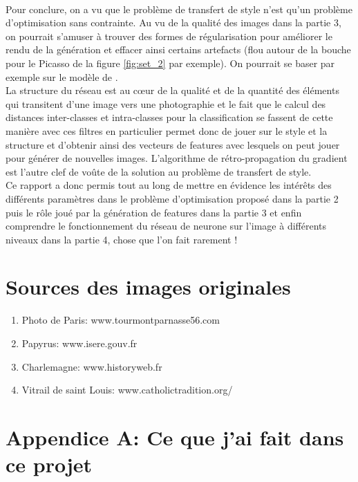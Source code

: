 \documentclass{article}
\begin{document}
\paragraph*{}
Pour conclure, on a vu que le problème de transfert de style n'est qu'un problème d'optimisation sans contrainte. Au vu de la qualité des images dans la partie 3, on pourrait s'amuser à trouver des formes de régularisation pour améliorer le rendu de la génération et effacer ainsi certains artefacts (flou autour de la bouche pour le Picasso de la figure \ref{fig:set_2} par exemple). On pourrait se baser par exemple sur le modèle de \cite{DBLP:journals/corr/MahendranV14}.\\
La structure du réseau est au cœur de la qualité et de la quantité des éléments qui transitent d'une image vers une photographie et le fait que le calcul des distances inter-classes et intra-classes pour la classification se fassent de cette manière avec ces filtres en particulier permet donc de jouer sur le style et la structure et d'obtenir ainsi des vecteurs de features avec lesquels on peut jouer pour générer de nouvelles images. L'algorithme de rétro-propagation du gradient est l'autre clef de voûte de la solution au problème de transfert de style.\\
Ce rapport a donc permis tout au long de mettre en évidence les intérêts des différents paramètres dans le problème d'optimisation proposé dans la partie 2 puis le rôle joué par la génération de features dans la partie 3 et enfin comprendre le fonctionnement du réseau de neurone sur l'image à différents niveaux dans la partie 4, chose que l'on fait rarement !


\section*{Sources des images originales}
\begin{enumerate}
\item Photo de Paris: www.tourmontparnasse56.com
\item Papyrus: www.isere.gouv.fr
\item Charlemagne: www.historyweb.fr
\item Vitrail de saint Louis: www.catholictradition.org/
\end{enumerate}




\section*{Appendice A: Ce que j'ai fait dans ce projet}
\end{document}
